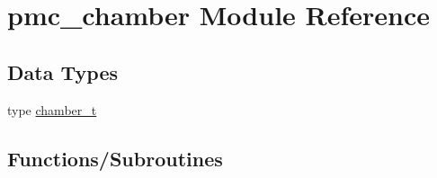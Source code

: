 \hypertarget{namespacepmc__chamber}{}\section{pmc\+\_\+chamber Module Reference}
\label{namespacepmc__chamber}
\subsection*{Data Types}
\begin{DoxyCompactItemize}
\item 
type \mbox{\hyperlink{structpmc__chamber_1_1chamber__t}{chamber\+\_\+t}}
\end{DoxyCompactItemize}
\subsection*{Functions/\+Subroutines}
